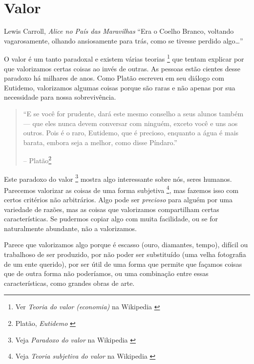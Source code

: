 \chapter{Valor}
\label{les:10}

\begin{chapquote}{Lewis Carroll, \textit{Alice no País das Maravilhas}}
\enquote{Era o Coelho Branco, voltando vagarosamente, olhando ansiosamente para trás, como se tivesse perdido algo\ldots}
\end{chapquote}

O valor é um tanto paradoxal e existem várias teorias \footnote{Ver \textit {Teoria do valor (economia)} na Wikipedia \cite{wiki:theory-of-value}} que tentam explicar por que valorizamos certas coisas ao invés de outras. As pessoas estão cientes desse paradoxo há milhares de anos. Como Platão escreveu em seu diálogo com Eutidemo, valorizamos algumas coisas porque são raras e não apenas por sua necessidade para nossa sobrevivência.

\begin{quotation}\begin{samepage}
\enquote{E se você for prudente, dará este mesmo conselho a seus alunos também --- que eles nunca devem conversar com ninguém, exceto você e uns aos outros. Pois é o raro, Eutidemo, que é precioso, enquanto a água é mais barata, embora seja a melhor, como disse Píndaro.}
\begin{flushright} -- Platão\footnote{Platão, \textit{Eutidemo} \cite{euthydemus}}
\end{flushright}\end{samepage}\end{quotation}

Este paradoxo do valor \footnote{Veja \textit {Paradoxo do valor} na Wikipedia \cite {wiki:paradox-of-value}} mostra algo interessante sobre nós, seres humanos. Parecemos valorizar as coisas de uma forma subjetiva \footnote{Veja \textit{Teoria subjetiva do valor} na Wikipedia \cite{wiki:subjective-theory-of-value}}, mas fazemos isso com certos critérios não arbitrários. Algo pode ser \textit{precioso} para alguém por uma variedade de razões, mas as coisas que valorizamos compartilham certas características. Se pudermos copiar algo com muita facilidade, ou se for naturalmente abundante, não a valorizamos.

Parece que valorizamos algo porque é escasso (ouro, diamantes, tempo), difícil ou trabalhoso de ser produzido, por não poder ser substituído (uma velha fotografia de um ente querido), por ser útil de uma forma que permite que façamos coisas que de outra forma não poderíamos, ou uma combinação entre essas características, como grandes obras de arte.

